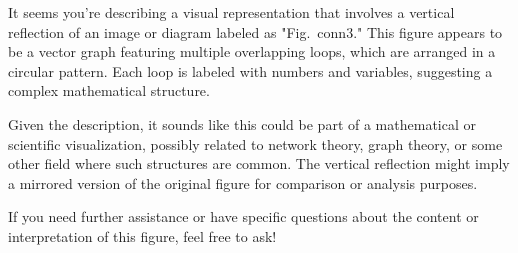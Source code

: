 It seems you're describing a visual representation that involves a vertical reflection of an image or diagram labeled as "Fig.~conn3." This figure appears to be a vector graph featuring multiple overlapping loops, which are arranged in a circular pattern. Each loop is labeled with numbers and variables, suggesting a complex mathematical structure.

Given the description, it sounds like this could be part of a mathematical or scientific visualization, possibly related to network theory, graph theory, or some other field where such structures are common. The vertical reflection might imply a mirrored version of the original figure for comparison or analysis purposes.

If you need further assistance or have specific questions about the content or interpretation of this figure, feel free to ask!